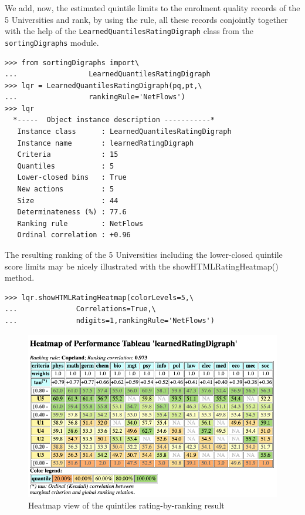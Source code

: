 We add, now, the estimated quintile limits to the enrolment quality records of the 5 Universities and rank, by using the \NetFlows rule, all these records conjointly together with the help of the \texttt{LearnedQuantilesRatingDigraph} class from the \texttt{sortingDigraphs} module.
\begin{lstlisting}
>>> from sortingDigraphs import\
...                 LearnedQuantilesRatingDigraph
>>> lqr = LearnedQuantilesRatingDigraph(pq,pt,\
...                 rankingRule='NetFlows')
>>> lqr
  *-----  Object instance description -----------*
   Instance class      : LearnedQuantilesRatingDigraph
   Instance name       : learnedRatingDigraph
   Criteria            : 15
   Quantiles           : 5
   Lower-closed bins   : True
   New actions         : 5
   Size                : 44
   Determinateness (%) : 77.6
   Ranking rule        : NetFlows
   Ordinal correlation : +0.96
\end{lstlisting}

The resulting ranking of the 5 Universities including the lower-closed quintile score limits may be nicely illustrated  with the showHTMLRatingHeatmap() method.
\begin{lstlisting}
>>> lqr.showHTMLRatingHeatmap(colorLevels=5,\
...              Correlations=True,\
...              ndigits=1,rankingRule='NetFlows')
\end{lstlisting}
\begin{figure}[ht]
\includegraphics[width=\hsize]{Figures/14-3-quintilingResult.png}
\caption{Heatmap view of the quintiles rating-by-ranking result}
\label{fig:14.3}       %
\end{figure}

